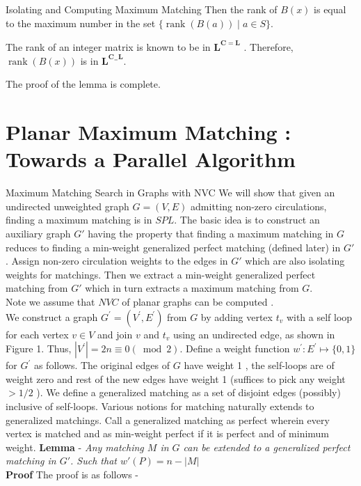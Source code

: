 \documentclass{beamer}
\begin{document}
\begin{frame}[allowframebreaks]{Isolating and Computing Maximum Matching}
	Then the rank of $B(x)$ is equal to the maximum number in the set $\{\operatorname{rank}(B(a)) \mid a \in S\}$.
	
	The rank of an integer matrix is known to be in $\mathbf{L}^{\mathbf{C}=\mathbf{L}}$ . Therefore, $\operatorname{rank}(B(x))$ is in $\mathbf{L}^{\mathbf{C}_{=} \mathbf{L}}$.
	
	The proof of the lemma is complete.
	
\end{frame}
\section{Planar Maximum Matching : Towards a Parallel Algorithm}
\begin{frame}[allowframebreaks]{Maximum Matching Search in Graphs with NVC}
	We will show that given an undirected unweighted graph $G = (V, E)$ admitting
	non-zero circulations, finding a maximum matching is in $SPL$. The basic idea is to construct
	an auxiliary graph $G'$ having the property that finding a maximum matching in $G$ reduces
	to finding a min-weight generalized perfect matching (defined later) in $G'$. Assign non-zero
	circulation weights to the edges in $G'$ which are also isolating weights for matchings. Then
	we extract a min-weight generalized perfect matching from $G'$ which in turn extracts a
	maximum matching from $G$.
	\\
	Note we assume that $NVC$ of planar graphs can be computed .
	\\
	We construct a graph $G^{\prime}=\left(V^{\prime}, E^{\prime}\right)$ from $G$ by adding vertex $t_v$ with a self loop for each vertex $v \in V$ and join $v$ and $t_v$ using an undirected edge, as shown in Figure 1. Thus, $\left|V^{\prime}\right|=2 n \equiv 0(\bmod 2)$.  Define a weight function $w^{\prime}: E^{\prime} \mapsto\{0,1\}$ for $G^{\prime}$ as follows. The original edges of $G$ have weight 1 , the self-loops are of weight zero and rest of the new edges have weight 1 (suffices to pick any weight $>1 / 2$ ). We define a generalized matching as a set of disjoint edges (possibly) inclusive of self-loops. Various notions for matching naturally extends to generalized matchings. Call a generalized matching as perfect wherein every vertex is matched and as min-weight perfect if it is perfect and of minimum weight.\break \break
	\textbf{Lemma} - \textit{Any matching  $M$ in $G$ can be extended to a generalized perfect matching in $G'$. Such that $w'(P)=n-|M|$}
	\\
	\textbf{Proof} The proof is as follows -

\end{frame}
\end{document}
